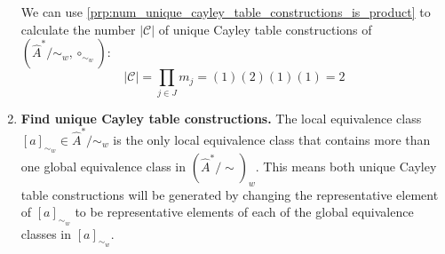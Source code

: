 \begin{proofE}
\begin{enumerate}[(1)]
    We can use \cref{prp:num_unique_cayley_table_constructions_is_product} to calculate the number $|\mathcal{C}|$ of unique Cayley table constructions of $(\hat{A}^{*}/\sim_{w}, \circ_{\sim_{w}})$:
    \begin{equation}
        |\mathcal{C}| = \prod_{j \in J} m_{j} = (1)(2)(1)(1) = 2
    \end{equation}

    \item \textbf{Find unique Cayley table constructions.}
    The local equivalence class $[a]_{\sim_{w}} \in \hat{A}^{*}/\sim_{w}$ is the only local equivalence class that contains more than one global equivalence class in $(\hat{A}^{*}/\sim)_{w}$.
    This means both unique Cayley table constructions will be generated by changing the representative element of $[a]_{\sim_{w}}$ to be representative elements of each of the global equivalence classes in $[a]_{\sim_{w}}$.


\end{enumerate}
\end{proofE}
